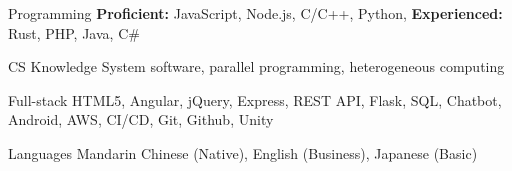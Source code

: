 
\begin{cvskills}
    \cvskill
    {Programming} %
    {\textbf{Proficient:} JavaScript, Node.js, C/C++, Python, \textbf{Experienced:} Rust, PHP, Java, C\#} %
    
    \cvskill
    {CS Knowledge} %
    {System software, parallel programming, heterogeneous computing} %

      \cvskill
        {Full-stack} %
        {HTML5, Angular, jQuery, Express, REST API, Flask, SQL, Chatbot, Android, AWS, CI/CD, Git, Github, Unity} %

      \cvskill
        {Languages} %
        {Mandarin Chinese (Native), English (Business), Japanese (Basic)} %
    
\end{cvskills}
